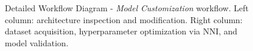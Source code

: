 \begin{figure}[htbp]
{}
\caption{Detailed Workflow Diagram - \textit{Model Customization} workflow. Left column: architecture inspection and modification. Right column: dataset acquisition, hyperparameter optimization via NNI, and model validation.}
\label{fig:detailed_flowchart_part2}
\end{figure}

